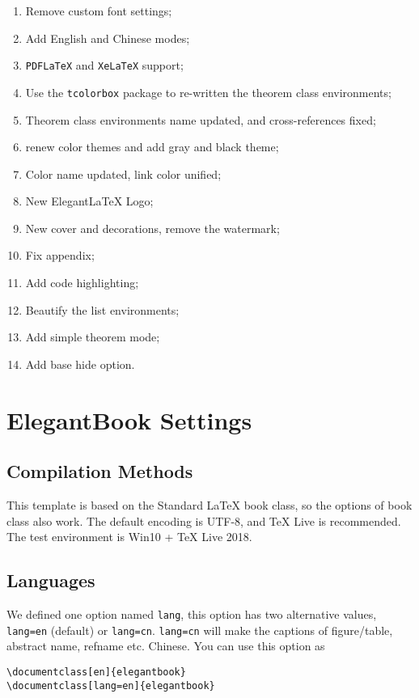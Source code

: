 \documentclass[noanswer,fancy,blue,11pt,hide]{elegantbook}
\begin{document}
\begin{enumerate}
   \item Remove custom font settings;
   \item Add English and Chinese modes;
   \item \lstinline{PDFLaTeX} and \lstinline{XeLaTeX} support;
   \item Use the \lstinline{tcolorbox} package to re-written the theorem class environments;
   \item Theorem class environments name updated, and cross-references fixed;
   \item renew color themes and add gray and black theme;
   \item Color name updated, link color unified;
   \item New Elegant\LaTeX{} Logo;
   \item New cover and decorations, remove the watermark;
   \item Fix appendix;
   \item Add code highlighting;
   \item Beautify the list environments;
   \item Add simple theorem mode;
   \item Add base hide option.
\end{enumerate}


\chapter{ElegantBook Settings}


\section{Compilation Methods}
This template is based on the Standard LaTeX book class,  so the options of book class also work. The default encoding is UTF-8, and \TeX{} Live is recommended. The test environment is Win10 + \TeX{} Live 2018. 


\section{Languages}

We defined one option named \lstinline{lang}, this option has two alternative values, \lstinline{lang=en} (default) or \lstinline{lang=cn}. \lstinline{lang=cn} will make the captions of figure/table, abstract name, refname etc. Chinese. You can use this option as
\begin{lstlisting}
\documentclass[en]{elegantbook} 
\documentclass[lang=en]{elegantbook}
\end{lstlisting}
\end{document}
